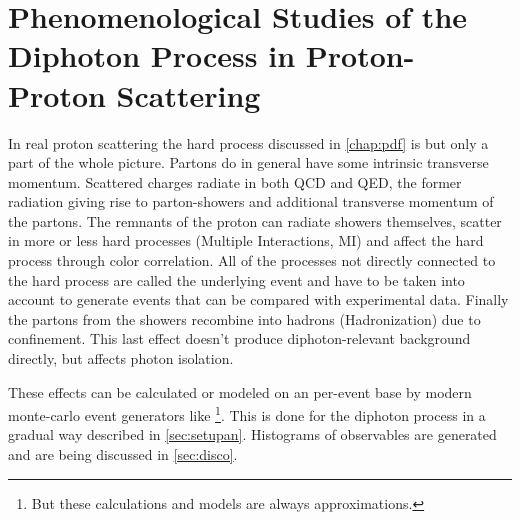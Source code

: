 \chapter{Phenomenological Studies of the Diphoton Process in Proton-Proton
  Scattering}%
\label{chap:pheno}

In real proton scattering the hard process discussed in
\cref{chap:pdf} is but only a part of the whole picture. Partons do in
general have some intrinsic transverse momentum.  Scattered charges
radiate in both QCD and QED, the former radiation giving rise to
parton-showers and additional transverse momentum of the partons. The
remnants of the proton can radiate showers themselves, scatter in more
or less hard processes (Multiple Interactions, MI) and affect the hard
process through color correlation. All of the processes not directly
connected to the hard process are called the underlying event and have
to be taken into account to generate events that can be compared with
experimental data. Finally the partons from the showers recombine into
hadrons (Hadronization) due to confinement. This last effect doesn't
produce diphoton-relevant background directly, but affects photon
isolation.~\cite[11]{buckley:2011ge} %

These effects can be calculated or modeled on an per-event base by
modern monte-carlo event generators like \sherpa\footnote{But these
  calculations and models are always approximations.}. This is done
for the diphoton process in a gradual way described in
\cref{sec:setupan}. Histograms of observables are generated and are
being discussed in \cref{sec:disco}.

